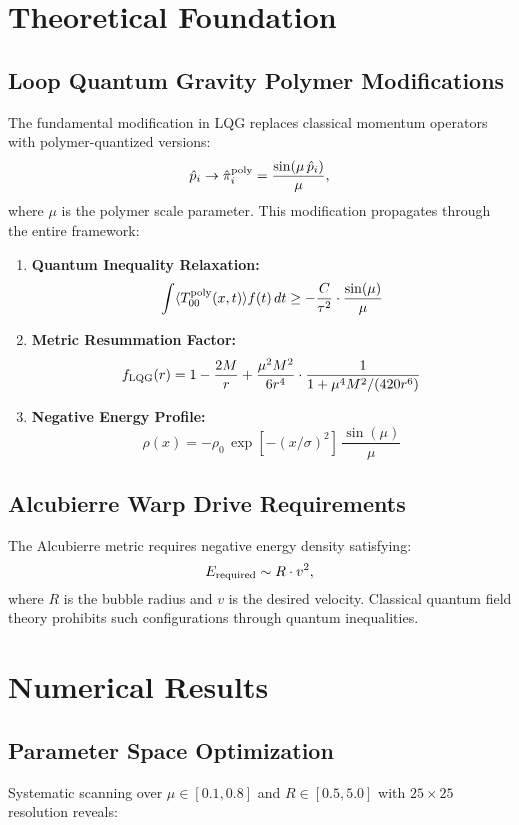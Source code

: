\documentclass[11pt]{article}
\begin{document}
\section{Theoretical Foundation}

\subsection{Loop Quantum Gravity Polymer Modifications}
The fundamental modification in LQG replaces classical momentum operators with polymer-quantized versions:
\[
  \hat{p}_i \rightarrow \hat{\pi}_i^{\rm poly} = \frac{\sin(\mu\,\hat{p}_i)}{\mu},
\]
where $\mu$ is the polymer scale parameter. This modification propagates through the entire framework:

\begin{enumerate}
  \item \textbf{Quantum Inequality Relaxation:}
        \[
          \int \langle T_{00}^{\rm poly}(x,t) \rangle f(t)\,dt \geq -\frac{C}{\tau^2} \cdot \frac{\sin(\mu)}{\mu}
        \]
        
  \item \textbf{Metric Resummation Factor:}
        \[
          f_{\rm LQG}(r) = 1 - \frac{2M}{r} + \frac{\mu^2 M^2}{6r^4} \cdot \frac{1}{1 + \mu^4 M^2/(420r^6)}
        \]
        
  \item \textbf{Negative Energy Profile:}
        \[
          \rho(x) = -\rho_0\,\exp\left[-(x/\sigma)^2\right]\,\frac{\sin(\mu)}{\mu}
        \]
\end{enumerate}

\subsection{Alcubierre Warp Drive Requirements}
The Alcubierre metric requires negative energy density satisfying:
\[
  E_{\rm required} \sim R \cdot v^2,
\]
where $R$ is the bubble radius and $v$ is the desired velocity. Classical quantum field theory prohibits such configurations through quantum inequalities.

\section{Numerical Results}

\subsection{Parameter Space Optimization}
Systematic scanning over $\mu \in [0.1, 0.8]$ and $R \in [0.5, 5.0]$ with $25 \times 25$ resolution reveals:
\end{document}
